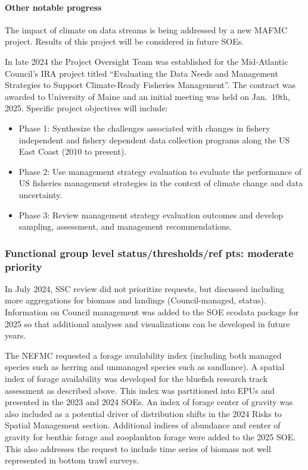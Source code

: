\documentclass[
  10pt,
]{article}
\providecommand{\tightlist}{%
  \setlength{\itemsep}{0pt}\setlength{\parskip}{0pt}}
\begin{document}
\hypertarget{other-notable-progress}{%
\paragraph{Other notable progress}\label{other-notable-progress}}

The impact of climate on data streams is being addressed by a new MAFMC
project. Results of this project will be considered in future SOEs.

In late 2024 the Project Oversight Team was established for the
Mid-Atlantic Council's IRA project titled ``Evaluating the Data Needs
and Management Strategies to Support Climate-Ready Fisheries
Management''. The contract was awarded to University of Maine and an
initial meeting was held on Jan.~10th, 2025. Specific project objectives
will include:

\begin{itemize}
\tightlist
\item
  Phase 1: Synthesize the challenges associated with changes in fishery
  independent and fishery dependent data collection programs along the
  US East Coast (2010 to present).
\item
  Phase 2: Use management strategy evaluation to evaluate the
  performance of US fisheries management strategies in the context of
  climate change and data uncertainty.
\item
  Phase 3: Review management strategy evaluation outcomes and develop
  sampling, assessment, and management recommendations.
\end{itemize}

\hypertarget{functional-group-level-statusthresholdsref-pts-moderate-priority}{%
\subsubsection{Functional group level status/thresholds/ref pts:
moderate
priority}\label{functional-group-level-statusthresholdsref-pts-moderate-priority}}

In July 2024, SSC review did not prioritize requests, but discussed
including more aggregations for biomass and landings (Council-managed,
status). Information on Council management was added to the SOE ecodata
package for 2025 so that additional analyses and visualizations can be
developed in future years.

The NEFMC requested a forage availability index (including both managed
species such as herring and unmanaged species such as sandlance). A
spatial index of forage availability was developed for the bluefish
research track assessment as described above. This index was partitioned
into EPUs and presented in the 2023 and 2024 SOEs. An index of forage
center of gravity was also included as a potential driver of
distribution shifts in the 2024 Risks to Spatial Management section.
Additional indices of abundance and center of gravity for benthic forage
and zooplankton forage were added to the 2025 SOE. This also addresses
the request to include time series of biomass not well represented in
bottom trawl surveys.
\end{document}
